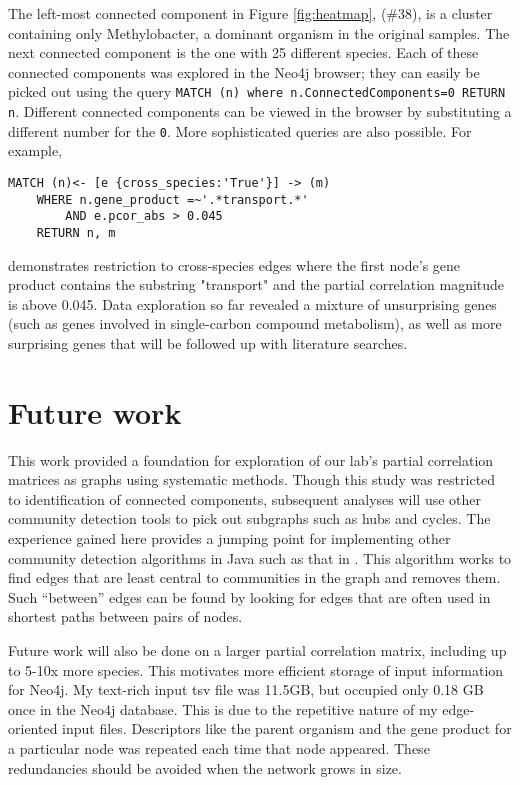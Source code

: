 \documentclass[12pt]{article}
\begin{document}
The left-most connected component in Figure \ref{fig:heatmap}, (\#38), is a cluster containing only Methylobacter, a dominant organism in the original samples. 
The next connected component is the one with 25 different species. 
Each of these connected components was explored in the Neo4j browser; they can easily be picked out using the query
\texttt{MATCH (n) where n.ConnectedComponents=0 RETURN n}.  
Different connected components can be viewed in the browser by substituting a different number for the \texttt{0}. 
More sophisticated queries are also possible. 
For example, %
\begin{verbatim} 
MATCH (n)<- [e {cross_species:'True'}] -> (m) 
    WHERE n.gene_product =~'.*transport.*' 
        AND e.pcor_abs > 0.045 
    RETURN n, m \end{verbatim}
demonstrates restriction to cross-species edges where the first node's gene product contains the substring "transport" and the partial correlation magnitude is above 0.045.
Data exploration so far revealed a mixture of unsurprising genes (such as genes involved in single-carbon compound metabolism), as well as more surprising genes that will be followed up with literature searches. 

\section{Future work}

This work provided a foundation for exploration of our lab's partial correlation matrices as graphs using systematic methods.
Though this study was restricted to identification of connected components, subsequent analyses will use other community detection tools to pick out subgraphs such as hubs and cycles.
The experience gained here provides a jumping point for implementing other community detection algorithms in Java such as that in \cite{girvan2002community}.
This algorithm works to find edges that are least central to communities in the graph and removes them.
Such ``between'' edges can be found by looking for edges that are often used in shortest paths between pairs of nodes.

Future work will also be done on a larger partial correlation matrix, including up to 5-10x more species.  
This motivates more efficient storage of input information for Neo4j. 
My text-rich input tsv file was 11.5GB, but occupied only 0.18 GB  once in the Neo4j database.
This is due to the repetitive nature of my edge-oriented input files. 
Descriptors like the parent organism and the gene product for a particular node was repeated each time that node appeared.
These redundancies should be avoided when the network grows in size. 
\end{document}

